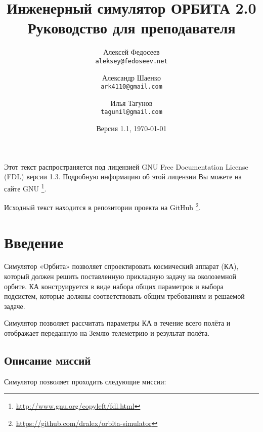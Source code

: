 \documentclass[12pt,a4paper]{article}
\begin{document}
\title{%
  \textbf{Инженерный симулятор ОРБИТА 2.0} \\
    Руководство для преподавателя}

\author{
  Алексей Федосеев\\
  \texttt{aleksey@fedoseev.net}
  \and
  Александр Шаенко\\
  \texttt{ark4110@gmail.com}
  \and
  Илья Тагунов\\
  \texttt{tagunil@gmail.com}
}

\date{Версия 1.1, \today}

\maketitle

Этот текст распространяется под лицензией GNU Free Documentation License (FDL) версии
1.3. Подробную информацию об этой лицензии Вы можете на сайте GNU
\footnote{\url{http://www.gnu.org/copyleft/fdl.html}}.

Исходный текст находится в репозитории проекта на GitHub
\footnote{\url{https://github.com/dralex/orbita-simulator}}.

\tableofcontents

\clearpage
\section{Введение}

Симулятор «Орбита» позволяет спроектировать космический аппарат (КА), который должен
решить поставленную прикладную задачу на околоземной орбите. КА конструируется в виде
набора общих параметров и выбора подсистем, которые должны соответствовать общим
требованиям и решаемой задаче.

Симулятор позволяет рассчитать параметры КА в течение всего полёта и отображает переданную
на Землю телеметрию и результат полёта.

\subsection{Описание миссий}

Симулятор позволяет проходить следующие миссии:
\end{document}
